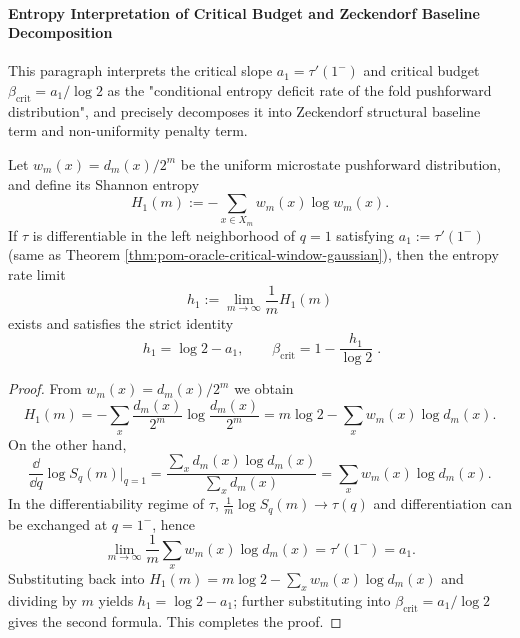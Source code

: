 \paragraph{Entropy Interpretation of Critical Budget and Zeckendorf Baseline Decomposition}
This paragraph interprets the critical slope \(a_1=\tau'(1^-)\) and critical budget \(\beta_{\mathrm{crit}}=a_1/\log 2\) as the "conditional entropy deficit rate of the fold pushforward distribution",
and precisely decomposes it into Zeckendorf structural baseline term and non-uniformity penalty term.

\begin{theorem}\label{thm:pom-oracle-critical-budget-entropy-identity}
Let \(w_m(x)=d_m(x)/2^m\) be the uniform microstate pushforward distribution, and define its Shannon entropy
\[
H_1(m):=-\sum_{x\in X_m}w_m(x)\log w_m(x).
\]
If \(\tau\) is differentiable in the left neighborhood of \(q=1\) satisfying \(a_1:=\tau'(1^-)\) (same as Theorem \ref{thm:pom-oracle-critical-window-gaussian}),
then the entropy rate limit
\[
h_1:=\lim_{m\to\infty}\frac{1}{m}H_1(m)
\]
exists and satisfies the strict identity
\[
\boxed{\;
h_1=\log 2-a_1,\qquad
\beta_{\mathrm{crit}}=1-\frac{h_1}{\log 2}\; } .
\]
\end{theorem}
\begin{proof}
From \(w_m(x)=d_m(x)/2^m\) we obtain
\[
H_1(m)
=-\sum_x \frac{d_m(x)}{2^m}\log\frac{d_m(x)}{2^m}
=m\log 2-\sum_x w_m(x)\log d_m(x).
\]
On the other hand,
\[
\frac{\dd}{\dd q}\log S_q(m)\Big|_{q=1}
=\frac{\sum_x d_m(x)\log d_m(x)}{\sum_x d_m(x)}
=\sum_x w_m(x)\log d_m(x).
\]
In the differentiability regime of \(\tau\), \(\frac{1}{m}\log S_q(m)\to\tau(q)\) and differentiation can be exchanged at \(q=1^-\), hence
\[
\lim_{m\to\infty}\frac{1}{m}\sum_x w_m(x)\log d_m(x)
=\tau'(1^-)=a_1.
\]
Substituting back into \(H_1(m)=m\log 2-\sum_x w_m(x)\log d_m(x)\) and dividing by \(m\) yields \(h_1=\log 2-a_1\);
further substituting into \(\beta_{\mathrm{crit}}=a_1/\log 2\) gives the second formula. This completes the proof.
\end{proof}

